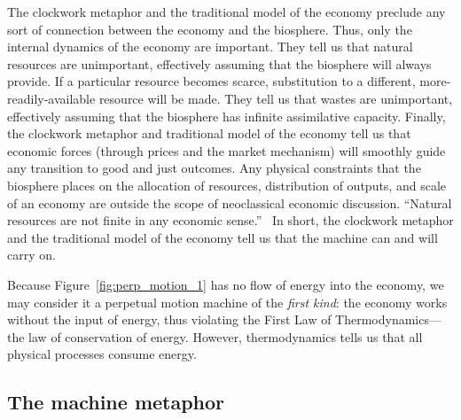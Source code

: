 The clockwork metaphor and the traditional model of the economy
preclude any sort of connection 
between the economy and the biosphere.
Thus, only the internal dynamics of the economy are important. 
They tell us that natural resources are unimportant, effectively assuming 
that the biosphere will always provide.
If a particular resource becomes scarce, 
substitution to a different, more-readily-available resource will be made.
They tell us that wastes are unimportant, effectively assuming that the biosphere
has infinite assimilative capacity.
Finally, the clockwork metaphor and traditional model of the economy 
tell us that economic forces 
(through prices and the market mechanism) will smoothly guide any transition
to good and just outcomes.
Any physical constraints that the biosphere places on 
the allocation of resources, distribution of outputs, and 
scale of an economy 
are outside the scope of neoclassical economic discussion.\cite{Daly1995}
``Natural resources are not finite in any economic sense.''~\cite[p.~54]{Simon1998} %
In short, the clockwork metaphor and the traditional model of the economy 
tell us that the machine can and will carry on.

Because Figure~\ref{fig:perp_motion_1} has no flow of energy
into the economy,
we may consider it a perpetual motion machine
of the \emph{first kind}:
the economy works without the input of energy, thus violating
the First Law of Thermodynamics---the 
law of conservation of energy.\cite{Rao2004}
However, thermodynamics tells us that all physical processes consume energy.


\subsection{The machine metaphor}
\label{sec:machine_metaphor}



